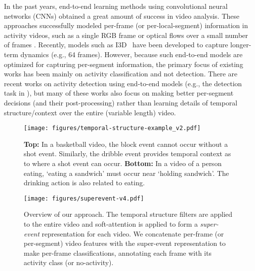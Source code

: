 \documentclass[10pt,twocolumn,letterpaper]{article}
\begin{document}
In the past years, end-to-end learning methods using convolutional neural networks (CNNs) obtained a great amount of success in video analysis. These approaches successfully modeled per-frame (or per-local-segment) information in activity videos, such as a single RGB frame or optical flows over a small number of frames \cite{feichtenhofer2016convolutional}. Recently, models such as I3D~\cite{carreira2017quo} have been developed to capture longer-term dynamics (e.g., 64 frames). However, because such end-to-end models are optimized for capturing per-segment information, the primary focus of existing works has been mainly on activity classification and not detection. There are recent works on activity detection using end-to-end models (e.g., the detection task in \cite{sigurdsson2016hollywood}), but many of these works also focus on making better per-segment decisions (and their post-processing) rather than learning details of temporal structure/context over the entire (variable length) video.


\begin{figure}
  \centering
    \texttt{[image: figures/temporal-structure-example\_v2.pdf]}
      \caption{{\bf Top:} In a basketball video, the block event cannot occur without a shot event. Similarly, the dribble event provides temporal context as to where a shot event can occur. {\bf Bottom:} In a video of a person eating, `eating a sandwich' must occur near `holding sandwich'. The drinking action is also related to eating.}
      \label{fig:temporal-example}
\end{figure}

\begin{figure*}
  \centering
    \texttt{[image: figures/superevent-v4.pdf]}
      \caption{Overview of our approach. The temporal structure filters are applied to the entire video and soft-attention is applied to form a \emph{super-event} representation for each video. We concatenate per-frame (or per-segment) video features with the super-event representation to make per-frame classifications, annotating each frame with its activity class (or no-activity).}
      \label{fig:model-overview}
\end{figure*}
\end{document}
